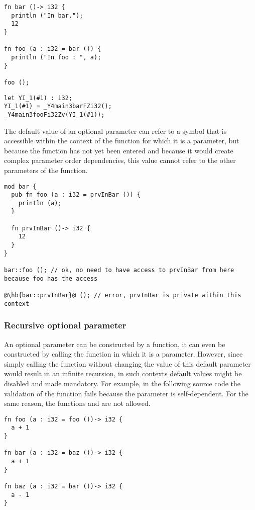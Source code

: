 \begin{lstlisting}[style=coloredverbatim]
fn bar ()-> i32 {
  println ("In bar.");
  12
}

fn foo (a : i32 = bar ()) {
  println ("In foo : ", a);
}

foo ();
\end{lstlisting}

\begin{lstlisting}[style=intermediateVerb]
let YI_1(#1) : i32;
YI_1(#1) = _Y4main3barFZi32();
_Y4main3fooFi32Zv(YI_1(#1));
\end{lstlisting}

The default value of an optional parameter can refer to a symbol that is
accessible within the context of the function for which it is a parameter, but
because the function has not yet been entered and because it would create
complex parameter order dependencies, this value cannot refer to the other
parameters of the function.

\begin{lstlisting}[style=coloredverbatim, escapechar=@]
mod bar {
  pub fn foo (a : i32 = prvInBar ()) {
    println (a);
  }

  fn prvInBar ()-> i32 {
    12
  }
}

bar::foo (); // ok, no need to have access to prvInBar from here because foo has the access

@\hb{bar::prvInBar}@ (); // error, prvInBar is private within this context
\end{lstlisting}

\subsubsection*{Recursive optional parameter}

An optional parameter can be constructed by a function, it can even be
constructed by calling the function in which it is a parameter. However, since
simply calling the function without changing the value of this default parameter
would result in an infinite recursion, in such contexts default values might be
disabled and made mandatory. For example, in the following source code the
validation of the function  fails because the parameter 
is self-dependent. For the same reason, the functions  and
 are not allowed.

\begin{lstlisting}[style=coloredverbatim]
fn foo (a : i32 = foo ())-> i32 {
  a + 1
}

fn bar (a : i32 = baz ())-> i32 {
  a + 1
}

fn baz (a : i32 = bar ())-> i32 {
  a - 1
}
\end{lstlisting}

